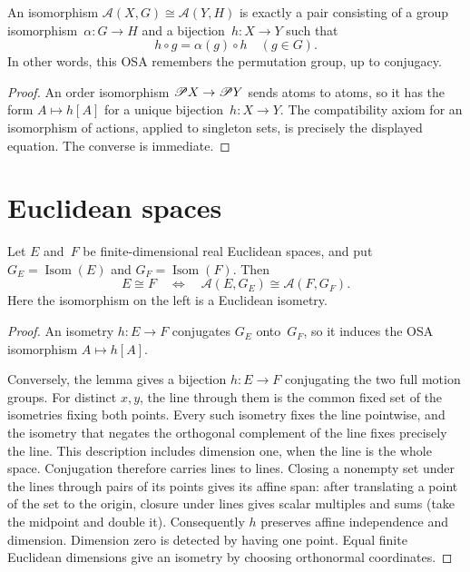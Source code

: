 \begin{lem}
An isomorphism
$\mathcal A(X,G)\cong\mathcal A(Y,H)$ is exactly a pair consisting of a
group isomorphism~$\alpha:G\to H$ and a bijection~$h:X\to Y$ such that
\[
 h\circ g=\alpha(g)\circ h\quad(g\in G).
\]
In other words, this OSA remembers the permutation group, up to conjugacy.
\end{lem}

\begin{proof}
An order isomorphism $\mathscr{P} X\to\mathscr{P} Y$ sends atoms to atoms, so it
has the form $A\mapsto h[A]$ for a unique bijection~$h:X\to Y$.  The
compatibility axiom for an isomorphism of actions, applied to singleton
sets, is precisely the displayed equation.  The converse is immediate.
\end{proof}

\section{Euclidean spaces}

\begin{prop}
Let $E$ and~$F$ be finite-dimensional real Euclidean spaces, and put
$G_E=\operatorname{Isom}(E)$ and $G_F=\operatorname{Isom}(F)$.  Then
\[
 E\cong F\quad\Longleftrightarrow\quad
 \mathcal A(E,G_E)\cong\mathcal A(F,G_F).
\]
Here the isomorphism on the left is a Euclidean isometry.
\end{prop}

\begin{proof}
An isometry $h:E\to F$ conjugates $G_E$ onto~$G_F$, so it induces the OSA
isomorphism $A\mapsto h[A]$.

Conversely, the lemma gives a bijection $h:E\to F$ conjugating the two full
motion groups. For distinct $x,y$, the line through them is the common
fixed set of the isometries fixing both points. Every such isometry fixes
the line pointwise, and the isometry that negates the orthogonal complement
of the line fixes precisely the line. This description includes dimension
one, when the line is the whole space. Conjugation therefore carries lines
to lines. Closing a nonempty set under the lines through pairs of its
points gives its affine span: after translating a point of the set to
the origin, closure under lines gives scalar multiples and sums (take
the midpoint and double it). Consequently $h$ preserves affine
independence and dimension. Dimension zero is detected by having one
point. Equal finite Euclidean dimensions give an isometry by choosing
orthonormal coordinates.
\end{proof}

